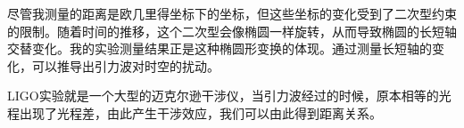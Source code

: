 尽管我测量的距离是欧几里得坐标下的坐标，但这些坐标的变化受到了二次型约束的限制。随着时间的推移，这个二次型会像椭圆一样旋转，从而导致椭圆的长短轴交替变化。我的实验测量结果正是这种椭圆形变换的体现。通过测量长短轴的变化，可以推导出引力波对时空的扰动。

LIGO实验就是一个大型的迈克尔逊干涉仪，当引力波经过的时候，原本相等的光程出现了光程差，由此产生干涉效应，我们可以由此得到距离关系。